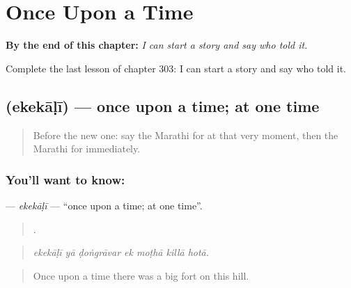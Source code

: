 
\chapter{Once Upon a Time}
\label{ch:mr-once-upon-a-time}

\begin{chapteropening}
\textbf{By the end of this chapter:} \emph{I can start a story and say who told it.}

Complete the last lesson of chapter 303: I can start a story and say who told it.
\end{chapteropening}

\section[\texorpdfstring{\mr{एकेकाळी} (ekekāḷī)}{एकेकाळी (ekekāḷī)}]{ (ekekāḷī) — once upon a time; at one time}

\label{lesson:MR-C303-ekekali}



\begin{quote}
Before the new one: say the Marathi for at that very moment, then the Marathi for immediately.
\end{quote}

\subsection*{You'll want to know: }
\textbf{} — \emph{ekekāḷī} — \textquotedblleft{}once upon a time; at one time\textquotedblright{}.

\begin{quote}
      .
\end{quote}

\begin{quote}
\emph{ekekāḷī yā ḍoṅgrāvar ek moṭhā killā hotā.}
\end{quote}

\begin{quote}
Once upon a time there was a big fort on this hill.
\end{quote}


